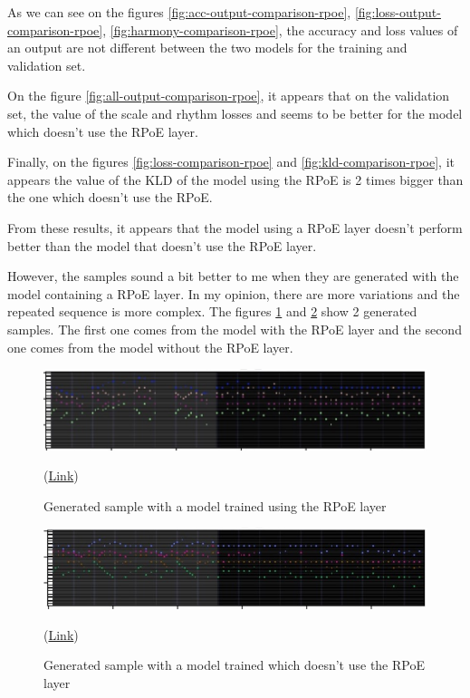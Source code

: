 \documentclass[12pt]{report}
\begin{document}
As we can see on the figures \ref{fig:acc-output-comparison-rpoe}, \ref{fig:loss-output-comparison-rpoe}, \ref{fig:harmony-comparison-rpoe}, the accuracy and loss values of an output are not different between the two models for the training and validation set.

On the figure \ref{fig:all-output-comparison-rpoe}, it appears that on the validation set, the value of the scale and rhythm losses and seems to be better for the model which doesn't use the RPoE layer.

Finally, on the figures \ref{fig:loss-comparison-rpoe} and \ref{fig:kld-comparison-rpoe}, it appears the value of the KLD of the model using the RPoE is 2 times bigger than the one which doesn't use the RPoE.

From these results, it appears that the model using a RPoE layer doesn't perform better than the model that doesn't use the RPoE layer.

However, the samples sound a bit better to me when they are generated with the model containing a RPoE layer.
In my opinion, there are more variations and the repeated sequence is more complex.
The figures \ref{fig:exp:rpoe:with} and \ref{fig:exp:rpoe:without} show 2 generated samples.
The first one comes from the model with the RPoE layer and the second one comes from the model without the RPoE layer.

\begin{figure}[htbp]
    \centering
    \includegraphics[width=\textwidth]{images/experiences/rpoe-rnn/generated-with-rpoe.jpg}
    \caption{Generated sample with a model trained using the RPoE layer}
    (\href{https://github.com/ValentinVignal/midiGenerator/blob/master/samples/rpoe-comparison/generated-with-rpoe.mid}{Link})
    \label{fig:exp:rpoe:with}
\end{figure}
\begin{figure}[htbp]
    \centering
    \includegraphics[width=\textwidth]{images/experiences/rpoe-rnn/generated-without-rpoe.jpg}
    \caption{Generated sample with a model trained which doesn't use the RPoE layer}
    (\href{https://github.com/ValentinVignal/midiGenerator/blob/master/samples/rpoe-comparison/generated-without-rpoe.mid}{Link})
    \label{fig:exp:rpoe:without}
\end{figure}
\end{document}
